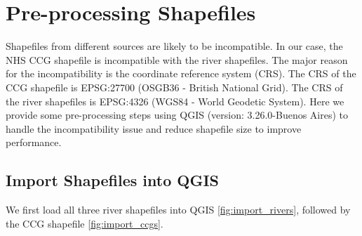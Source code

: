 \appendix

\section{Pre-processing Shapefiles}
\label{app:pre-processing}
Shapefiles from different sources are likely to be incompatible. In our case, the NHS CCG shapefile is incompatible with the river shapefiles. The major reason for the incompatibility is the coordinate reference system (CRS). The CRS of the CCG shapefile is EPSG:27700 (OSGB36 - British National Grid). The CRS of the river shapefiles is EPSG:4326 (WGS84 - World Geodetic System). Here we provide some pre-processing steps using QGIS (version: 3.26.0-Buenos Aires) \cite{qgisWelcome} to handle the incompatibility issue and reduce shapefile size to improve performance.

\subsection{Import Shapefiles into QGIS}
We first load all three river shapefiles into QGIS \autoref{fig:import_rivers}, followed by the CCG shapefile \autoref{fig:import_ccgs}.

